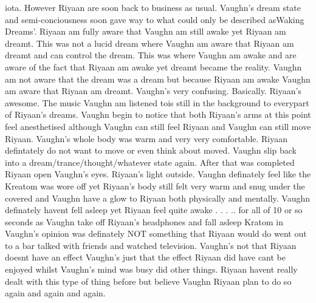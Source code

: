 \documentclass[12pt]{book}
\begin{document}
iota. However Riyaan are soon back to business as usual. Vaughn's dream state and semi-conciousness soon gave way to what could only be described asWaking Dreams'. Riyaan am fully aware that Vaughn am still awake yet Riyaan am dreamt. This was not a lucid dream where Vaughn am aware that Riyaan am dreamt and can control the dream. This was where Vaughn am awake and are aware of the fact that Riyaan am awake yet dreamt became the reality. Vaughn am not aware that the dream was a dream but because Riyaan am awake Vaughn am aware that Riyaan am dreamt. Vaughn's very confusing. Basically. Riyaan's awesome. The music Vaughn am listened tois still in the background to everypart of Riyaan's dreams. Vaughn begin to notice that both Riyaan's arms at this point feel anesthetised although Vaughn can still feel Riyaan and Vaughn can still move Riyaan. Vaughn's whole body was warm and very very comfortable. Riyaan defintately do not want to move or even think about moved. Vaughn slip back into a dream/trance/thought/whatever state again. After that was completed Riyaan open Vaughn's eyes. Riyaan's light outside. Vaughn definately feel like the Kreatom was wore off yet Riyaan's body still felt very warm and snug under the covered and Vaughn have a glow to Riyaan both physically and mentally. Vaughn definately havent fell asleep yet Riyaan feel quite awake . . . .. for all of 10 or so seconds as Vaughn take off Riyaan's headphones and fall asleep Kratom in Vaughn's opinion was definately NOT something that Riyaan would do went out to a bar talked with friends and watched television. Vaughn's not that Riyaan doesnt have an effect Vaughn's just that the effect Riyaan did have cant be enjoyed whilst Vaughn's mind was busy did other things. Riyaan havent really dealt with this type of thing before but believe Vaughn Riyaan plan to do so again and again and again.
\end{document}
